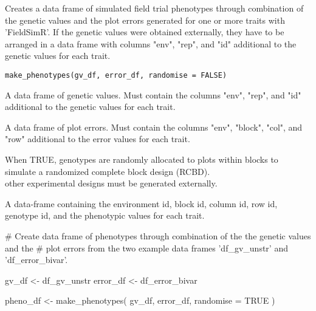 \documentclass[a4paper]{book}
\begin{document}
%
\begin{Description}\relax
Creates a data frame of simulated field trial phenotypes through combination of the genetic
values and the plot errors generated for one or more traits with 'FieldSimR'. If the
genetic values were obtained externally, they have to be arranged in a data frame with columns
"env", "rep", and "id" additional to the genetic values for each trait.
\end{Description}
%
\begin{Usage}
\begin{verbatim}
make_phenotypes(gv_df, error_df, randomise = FALSE)
\end{verbatim}
\end{Usage}
%
\begin{Arguments}
\begin{ldescription}
\item[\code{gv\_df}] A data frame of genetic values. Must contain the columns "env", "rep", and "id"
additional to the genetic values for each trait.

\item[\code{error\_df}] A data frame of plot errors. Must contain the columns "env", "block",
"col", and "row" additional to the error values for each trait.

\item[\code{randomise}] When TRUE, genotypes are randomly allocated to plots within blocks to simulate
a randomized complete block design (RCBD).\\{}
 other experimental designs must be generated externally.
\end{ldescription}
\end{Arguments}
%
\begin{Value}
A data-frame containing the environment id, block id, column id, row id, genotype id,
and the phenotypic values for each trait.
\end{Value}
%
\begin{Examples}
\begin{ExampleCode}
# Create data frame of phenotypes through combination of the the genetic values and the
# plot errors from the two example data frames 'df_gv_unstr' and 'df_error_bivar'.

gv_df <- df_gv_unstr
error_df <- df_error_bivar

pheno_df <- make_phenotypes(
  gv_df,
  error_df,
  randomise = TRUE
)
\end{ExampleCode}
\end{Examples}
\end{document}
